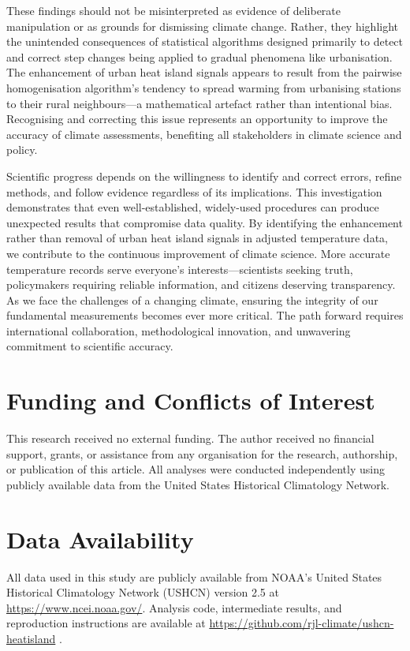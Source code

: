 \documentclass[11pt, a4paper]{article}
\begin{document}
These findings should not be misinterpreted as evidence of deliberate manipulation or as grounds for dismissing climate change. Rather, they highlight the unintended consequences of statistical algorithms designed primarily to detect and correct step changes being applied to gradual phenomena like urbanisation. The enhancement of urban heat island signals appears to result from the pairwise homogenisation algorithm's tendency to spread warming from urbanising stations to their rural neighbours—a mathematical artefact rather than intentional bias. Recognising and correcting this issue represents an opportunity to improve the accuracy of climate assessments, benefiting all stakeholders in climate science and policy.

Scientific progress depends on the willingness to identify and correct errors, refine methods, and follow evidence regardless of its implications. This investigation demonstrates that even well-established, widely-used procedures can produce unexpected results that compromise data quality. By identifying the enhancement rather than removal of urban heat island signals in adjusted temperature data, we contribute to the continuous improvement of climate science. More accurate temperature records serve everyone's interests—scientists seeking truth, policymakers requiring reliable information, and citizens deserving transparency. As we face the challenges of a changing climate, ensuring the integrity of our fundamental measurements becomes ever more critical. The path forward requires international collaboration, methodological innovation, and unwavering commitment to scientific accuracy.


\section*{Funding and Conflicts of Interest}

This research received no external funding. The author received no financial support, grants, or assistance from any organisation for the research, authorship, or publication of this article. All analyses were conducted independently using publicly available data from the United States Historical Climatology Network.

\section*{Data Availability}

All data used in this study are publicly available from NOAA's United States Historical Climatology Network (USHCN) version 2.5 at \url{https://www.ncei.noaa.gov/}. Analysis code, intermediate results, and reproduction instructions are available at \url{https://github.com/rjl-climate/ushcn-heatisland} \parencite{lyon2025ushcn}.

\printbibliography[title={References}] %
\end{document}
